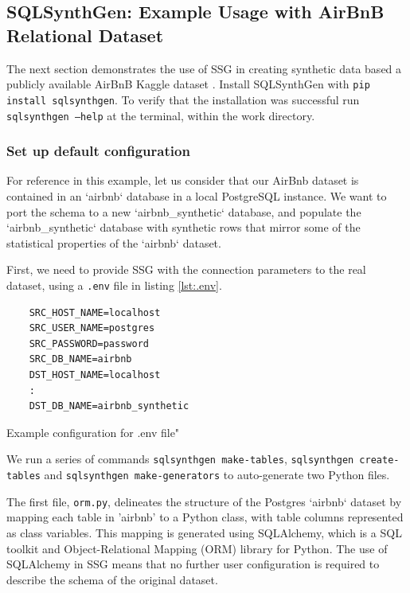 \documentclass[11pt]{article}
\begin{document}
\subsection{SQLSynthGen: Example Usage with AirBnB Relational Dataset}

The next section demonstrates the use of SSG in creating synthetic data based a publicly available AirBnB Kaggle dataset \cite{airbnb}. Install SQLSynthGen with \texttt{pip install sqlsynthgen}. To verify that the installation was successful run \texttt{sqlsynthgen --help} at the terminal, within the work directory. 

\subsubsection{Set up default configuration}

For reference in this example, let us consider that our AirBnb dataset is contained in an `airbnb` database in a local PostgreSQL instance. We want to port the schema to a new `airbnb\_synthetic` database, and populate the `airbnb\_synthetic` database with synthetic rows that mirror some of the statistical properties of the `airbnb` dataset.

First, we need to provide SSG with the connection parameters to the real dataset, using a \texttt{.env} file in listing \ref{lst:.env}.

\begin{listing}[H]
\begin{verbatim}
    SRC_HOST_NAME=localhost 
    SRC_USER_NAME=postgres 
    SRC_PASSWORD=password
    SRC_DB_NAME=airbnb 
    DST_HOST_NAME=localhost 
    :
    DST_DB_NAME=airbnb_synthetic
\end{verbatim}
\caption{Example configuration for .env file"}
\label{lst:.env}
\end{listing}

We run a series of commands \texttt{sqlsynthgen make-tables}, \texttt{sqlsynthgen create-tables} and \texttt{sqlsynthgen make-generators} to auto-generate two Python files. 

The first file, \texttt{orm.py}, delineates the structure of the Postgres `airbnb` dataset by mapping each table in 'airbnb' to a Python class, with table columns represented as class variables. This mapping is generated using SQLAlchemy\cite{sqlalchemy}, which is a SQL toolkit and Object-Relational Mapping (ORM) library for Python. The use of SQLAlchemy in SSG means that no further user configuration is required to describe the schema of the original dataset. 
\end{document}
